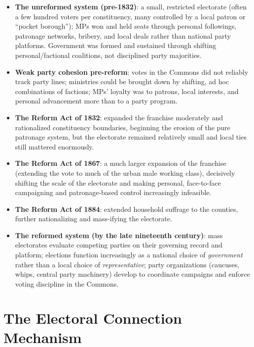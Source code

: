 \documentclass[12pt]{article}
\begin{document}
\begin{itemize}[leftmargin=*, itemsep=4pt]
    \item \textbf{The unreformed system (pre-1832)}: a small, restricted electorate (often a few hundred voters per constituency, many controlled by a local patron or ``pocket borough''); MPs won and held seats through personal followings, patronage networks, bribery, and local deals rather than national party platforms. Government was formed and sustained through shifting personal/factional coalitions, not disciplined party majorities.
    \item \textbf{Weak party cohesion pre-reform}: votes in the Commons did not reliably track party lines; ministries could be brought down by shifting, ad hoc combinations of factions; MPs' loyalty was to patrons, local interests, and personal advancement more than to a party program.
    \item \textbf{The Reform Act of 1832}: expanded the franchise moderately and rationalized constituency boundaries, beginning the erosion of the pure patronage system, but the electorate remained relatively small and local ties still mattered enormously.
    \item \textbf{The Reform Act of 1867}: a much larger expansion of the franchise (extending the vote to much of the urban male working class), decisively shifting the scale of the electorate and making personal, face-to-face campaigning and patronage-based control increasingly infeasible.
    \item \textbf{The Reform Act of 1884}: extended household suffrage to the counties, further nationalizing and mass-ifying the electorate.
    \item \textbf{The reformed system (by the late nineteenth century)}: mass electorates evaluate competing parties on their governing record and platform; elections function increasingly as a national choice of \textit{government} rather than a local choice of \textit{representative}; party organizations (caucuses, whips, central party machinery) develop to coordinate campaigns and enforce voting discipline in the Commons.
\end{itemize}

\section{The Electoral Connection Mechanism}
\end{document}
